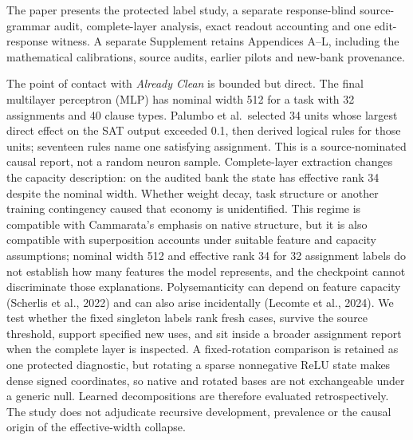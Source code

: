 \documentclass[
  british,
  11pt,
  a4paper,
]{article}
\begin{document}
The paper presents the protected label study, a separate response-blind
source-grammar audit, complete-layer analysis, exact readout accounting
and one edit-response witness. A separate Supplement retains Appendices
A--L, including the mathematical calibrations, source audits, earlier
pilots and new-bank provenance.

The point of contact with \emph{Already Clean} is bounded but direct.
The final multilayer perceptron (MLP) has nominal width 512 for a task
with 32 assignments and 40 clause types. Palumbo et al.~selected 34
units whose largest direct effect on the SAT output exceeded 0.1, then
derived logical rules for those units; seventeen rules name one
satisfying assignment. This is a source-nominated causal report, not a
random neuron sample. Complete-layer extraction changes the capacity
description: on the audited bank the state has effective rank 34 despite
the nominal width. Whether weight decay, task structure or another
training contingency caused that economy is unidentified. This regime is
compatible with Cammarata's emphasis on native structure, but it is also
compatible with superposition accounts under suitable feature and
capacity assumptions; nominal width 512 and effective rank 34 for 32
assignment labels do not establish how many features the model
represents, and the checkpoint cannot discriminate those explanations.
Polysemanticity can depend on feature capacity (Scherlis et al., 2022)
and can also arise incidentally (Lecomte et al., 2024). We test whether
the fixed singleton labels rank fresh cases, survive the source
threshold, support specified new uses, and sit inside a broader
assignment report when the complete layer is inspected. A fixed-rotation
comparison is retained as one protected diagnostic, but rotating a
sparse nonnegative ReLU state makes dense signed coordinates, so native
and rotated bases are not exchangeable under a generic null. Learned
decompositions are therefore evaluated retrospectively. The study does
not adjudicate recursive development, prevalence or the causal origin of
the effective-width collapse.
\end{document}
